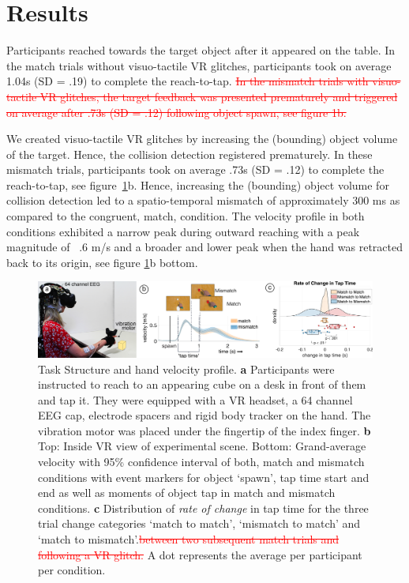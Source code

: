 
\section{Results}

Participants reached towards the target object after it appeared on the table. In the match trials without visuo-tactile VR glitches, participants took on average 1.04s (SD = .19) to complete the reach-to-tap. \textcolor{red}{\st{In the mismatch trials with visuo-tactile VR glitches, the target feedback was presented prematurely and triggered on average after .73s (SD = .12) following object spawn, see figure 1b.}}

\textcolor{n}{We created visuo-tactile VR glitches by increasing the (bounding) object volume of the target. Hence, the collision detection registered prematurely. In these mismatch trials, participants took on average .73s (SD = .12) to complete the reach-to-tap, see figure~\ref{setup_and_behavior}b.} Hence, increasing the (bounding) object volume for collision detection led to a spatio-temporal mismatch of approximately 300 ms as compared to the congruent, match, condition. The velocity profile in both conditions exhibited a narrow peak during outward reaching with a peak magnitude of ~.6 m/s and a broader and lower peak when the hand was retracted back to its origin, see figure \ref{setup_and_behavior}b bottom.

\begin{figure}[!h]
  \includegraphics[width=\textwidth]{figures/task_behavior_new.pdf}
  \caption{Task Structure and hand velocity profile. \textbf{a} Participants were instructed to reach to an appearing cube on a desk in front of them and tap it. They were equipped with a VR headset, a 64 channel EEG cap, electrode spacers and rigid body tracker on the hand. The vibration motor was placed under the fingertip of the index finger. \textbf{b} Top: Inside VR view of experimental scene. Bottom: Grand-average velocity with 95\% confidence interval of both, match and mismatch conditions with event markers for object `spawn', tap time start and end as well as moments of object tap in match and mismatch conditions. \textbf{c} Distribution of \textit{rate of change} in tap time \textcolor{n}{for the three trial change categories `match to match', `mismatch to match' and `match to mismatch'.}\textcolor{red}{\st{between two subsequent match trials and following a VR glitch.}} A dot represents the average per participant per condition.}
  \label{setup_and_behavior}
\end{figure}

